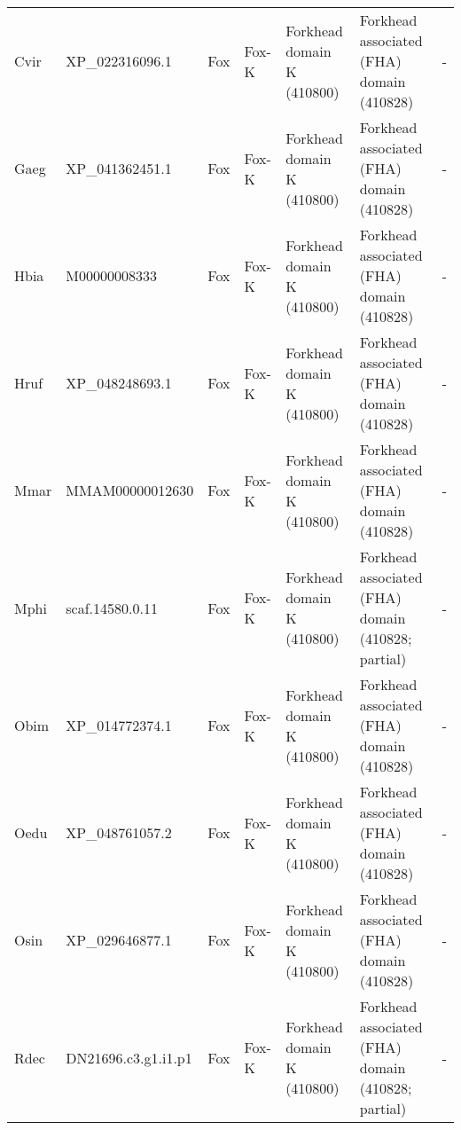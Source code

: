 \documentclass[../main.tex]{subfiles}
\begin{document}
\begin{landscape}
\begin{longtable}{lllllll}
		Cvir           & XP\_022316096.1       & Fox            & Fox-K               & Forkhead domain K (410800)                  & Forkhead associated (FHA) domain (410828)                              & -                    \\
		Gaeg           & XP\_041362451.1       & Fox            & Fox-K               & Forkhead domain K (410800)                  & Forkhead associated (FHA) domain (410828)                              & -                    \\
		Hbia           & M00000008333          & Fox            & Fox-K               & Forkhead domain K (410800)                  & Forkhead associated (FHA) domain (410828)                              & -                    \\
		Hruf           & XP\_048248693.1       & Fox            & Fox-K               & Forkhead domain K (410800)                  & Forkhead associated (FHA) domain (410828)                              & -                    \\
		Mmar           & MMAM00000012630       & Fox            & Fox-K               & Forkhead domain K (410800)                  & Forkhead associated (FHA) domain (410828)                              & -                    \\
		Mphi           & scaf.14580.0.11       & Fox            & Fox-K               & Forkhead domain K (410800)                  & Forkhead associated (FHA) domain (410828; partial)                     & -                    \\
		Obim           & XP\_014772374.1       & Fox            & Fox-K               & Forkhead domain K (410800)                  & Forkhead associated (FHA) domain (410828)                              & -                    \\
		Oedu           & XP\_048761057.2       & Fox            & Fox-K               & Forkhead domain K (410800)                  & Forkhead associated (FHA) domain (410828)                              & -                    \\
		Osin           & XP\_029646877.1       & Fox            & Fox-K               & Forkhead domain K (410800)                  & Forkhead associated (FHA) domain (410828)                              & -                    \\
		Rdec           & DN21696.c3.g1.i1.p1   & Fox            & Fox-K               & Forkhead domain K (410800)                  & Forkhead associated (FHA) domain (410828; partial)                     & -                    \\

\end{longtable}
\end{landscape}
\end{document}
